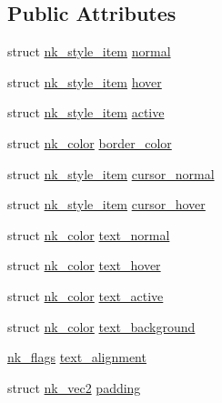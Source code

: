 \subsection*{Public Attributes}
\begin{DoxyCompactItemize}
\item 
struct \mbox{\hyperlink{structnk__style__item}{nk\+\_\+style\+\_\+item}} \mbox{\hyperlink{structnk__style__toggle_a4695e620bafae18faf6978d584042247}{normal}}
\item 
struct \mbox{\hyperlink{structnk__style__item}{nk\+\_\+style\+\_\+item}} \mbox{\hyperlink{structnk__style__toggle_a153b011fb05353d22a0f05b0ccc1686b}{hover}}
\item 
struct \mbox{\hyperlink{structnk__style__item}{nk\+\_\+style\+\_\+item}} \mbox{\hyperlink{structnk__style__toggle_a530dd1ded7867e555198fe08b666146f}{active}}
\item 
struct \mbox{\hyperlink{structnk__color}{nk\+\_\+color}} \mbox{\hyperlink{structnk__style__toggle_a29792744d84cac0d0ca2c80caf83b2d9}{border\+\_\+color}}
\item 
struct \mbox{\hyperlink{structnk__style__item}{nk\+\_\+style\+\_\+item}} \mbox{\hyperlink{structnk__style__toggle_a2c94fa24f691cf912eb0551222cd5212}{cursor\+\_\+normal}}
\item 
struct \mbox{\hyperlink{structnk__style__item}{nk\+\_\+style\+\_\+item}} \mbox{\hyperlink{structnk__style__toggle_a081dad4b009cc2b0fb91eb1bd59b8b2e}{cursor\+\_\+hover}}
\item 
struct \mbox{\hyperlink{structnk__color}{nk\+\_\+color}} \mbox{\hyperlink{structnk__style__toggle_a21ecdac052ef22bdecad6ad23476c6ea}{text\+\_\+normal}}
\item 
struct \mbox{\hyperlink{structnk__color}{nk\+\_\+color}} \mbox{\hyperlink{structnk__style__toggle_a60e3f7dbe4de71e4e93c887a57962367}{text\+\_\+hover}}
\item 
struct \mbox{\hyperlink{structnk__color}{nk\+\_\+color}} \mbox{\hyperlink{structnk__style__toggle_a4559d75c458feb0065dc0ce215a9aea8}{text\+\_\+active}}
\item 
struct \mbox{\hyperlink{structnk__color}{nk\+\_\+color}} \mbox{\hyperlink{structnk__style__toggle_af2a9e2bb0d58a1b757c968cc3fc556d3}{text\+\_\+background}}
\item 
\mbox{\hyperlink{nuklear_8h_a19e0e2f6db4862891d9801de3c3da323}{nk\+\_\+flags}} \mbox{\hyperlink{structnk__style__toggle_a5cb04eaf2146d08a6488138f41fd263a}{text\+\_\+alignment}}
\item 
struct \mbox{\hyperlink{structnk__vec2}{nk\+\_\+vec2}} \mbox{\hyperlink{structnk__style__toggle_a0eca091d63d706e3301362592b7716a3}{padding}}

\end{DoxyCompactItemize}
